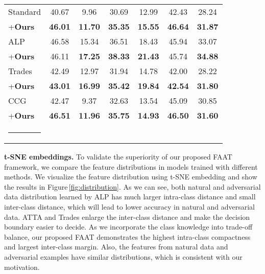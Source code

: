 \documentclass[10pt,twocolumn,letterpaper]{article}
\makeatletter
\def\hlinew#1{%
  \noalign{\ifnum0=`}\fi\hrule \@height #1 \futurelet
   \reserved@a\@xhline}
\makeatother
\begin{document}
\begin{table*}[!h]
\begin{tabular}{lcccccc}
          Standard  &40.67          & 9.96      & 30.69      & 12.99       & 42.43          & 28.24  \\
                 \rowcolor{mygray}
          +\textbf{Ours}  &\textbf{46.01}          & \textbf{11.70  }   & \textbf{35.35}      & \textbf{15.55}       & \textbf{46.64}          & \textbf{31.87} \\
       
         ALP~\cite{58kannan2018adversarial}    &46.58          & 15.34     & 36.51      & 18.43       & 45.94          & 33.07  \\ 
        \rowcolor{mygray}
        +\textbf{Ours}     & 46.11 & \textbf{17.25} & \textbf{38.33} & \textbf{21.43}  & 45.74    & \textbf{34.88}\\
         Trades~\cite{Zhang2019tradeoff} &42.49          & {12.97}     & 31.94      & 14.78       & 42.00          & 28.22  \\ 
        \rowcolor{mygray}
         +\textbf{Ours}    & \textbf{43.01} & \textbf{16.99} & \textbf{35.42} & \textbf{19.84}  & \textbf{42.54 }   & \textbf{31.80} \\
           CCG\cite{tack2021consistency}    &42.47          & 9.37      & 32.63      & 13.54       & 45.09          & 30.85  \\ 
        \rowcolor{mygray}
        +\textbf{Ours}    & \textbf{46.51} & \textbf{11.96} & \textbf{35.75} & \textbf{14.93}  & \textbf{46.50}    & \textbf{31.60} \\
        \hlinew{1pt} 
        \end{tabular}
    \end{table*}
 
\newpage   
\noindent\textbf{t-SNE embeddings.} To validate the superiority of our proposed FAAT framework, we compare the feature distributions in models trained with different methods. We visualize the feature distribution using t-SNE embedding and show the results in Figure\,\ref{fig:distribution}. As we can see, both natural and adversarial data distribution learned by ALP has much larger intra-class distance and small inter-class distance, which will lead to lower accuracy in natural and adversarial data. ATTA and Trades enlarge the inter-class distance and make the decision boundary easier to decide. As we incorporate the class knowledge into trade-off balance, our proposed FAAT demonstrates the highest intra-class compactness and largest inter-class margin. Also, the features from natural data and adversarial examples have similar distributions, which is consistent with our motivation.
\end{document}
